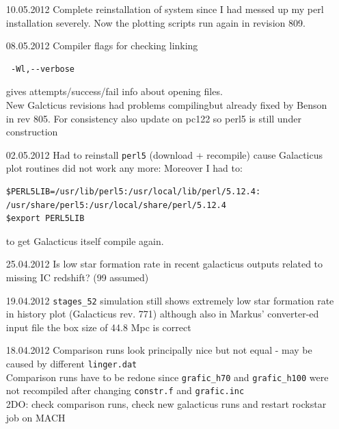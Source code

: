 \begin{itemize}
\item[10.05.2012]
Complete reinstallation of system since I had messed up my perl installation 
severely. Now the plotting scripts run again in revision 809. 

\item[08.05.2012]
Compiler flags for checking linking 
\begin{verbatim}
 -Wl,--verbose
\end{verbatim}
gives attempts/success/fail info about opening files. \\
New Galcticus revisions had problems compilingbut already 
fixed by Benson in rev 805. For consistency also update 
on pc122 so perl5 is still under construction \\

\item[02.05.2012]
Had to reinstall \texttt{perl5} (download + recompile) 
cause Galacticus plot routines did not work any more: 
Moreover I had to: 
\begin{verbatim}
$PERL5LIB=/usr/lib/perl5:/usr/local/lib/perl/5.12.4:
/usr/share/perl5:/usr/local/share/perl/5.12.4
$export PERL5LIB
\end{verbatim}
to get Galacticus itself compile again. \\

\item[25.04.2012]
Is low star formation rate in recent galacticus outputs 
related to missing IC redshift? (99 assumed) \\

\item[19.04.2012]
\texttt{stages\_52} simulation still shows extremely low 
star formation rate in history plot (Galacticus rev. 771) 
although also in Markus' converter-ed input file the box 
size of 44.8 Mpc is correct \\ 


\item[18.04.2012]
Comparison runs look principally nice but not equal - may be 
caused by different \texttt{linger.dat} \\
Comparison runs have to be redone since \texttt{grafic\_h70}
and \texttt{grafic\_h100} were 
not recompiled after changing \texttt{constr.f} and \texttt{grafic.inc} \\
2DO: check comparison runs, check new galacticus runs and 
restart rockstar job on MACH \\


\end{itemize}
